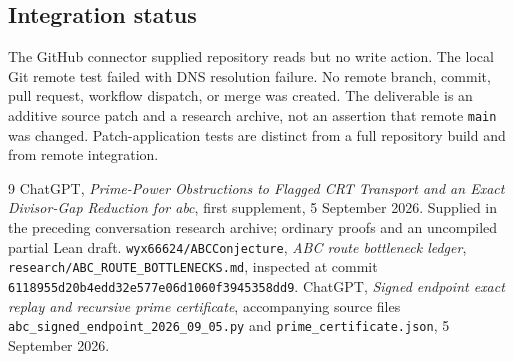 \documentclass[11pt]{article}
\theoremstyle{definition}\newtheorem{definition}[theorem]{Definition}
\theoremstyle{remark}\newtheorem{remark}[theorem]{Remark}
\begin{document}
\subsection{Integration status}
The GitHub connector supplied repository reads but no write action. The local Git remote test failed with DNS resolution failure. No remote branch, commit, pull request, workflow dispatch, or merge was created. The deliverable is an additive source patch and a research archive, not an assertion that remote \texttt{main} was changed. Patch-application tests are distinct from a full repository build and from remote integration.

\begin{thebibliography}{9}
 ChatGPT, \emph{Prime-Power Obstructions to Flagged CRT Transport and an Exact Divisor-Gap Reduction for abc}, first supplement, 5 September 2026. Supplied in the preceding conversation research archive; ordinary proofs and an uncompiled partial Lean draft.
 \texttt{wyx66624/ABCConjecture}, \emph{ABC route bottleneck ledger}, \texttt{research/ABC\_ROUTE\_BOTTLENECKS.md}, inspected at commit \texttt{6118955d20b4edd32e577e06d1060f3945358dd9}.
 ChatGPT, \emph{Signed endpoint exact replay and recursive prime certificate}, accompanying source files \texttt{abc\_signed\_endpoint\_2026\_09\_05.py} and \texttt{prime\_certificate.json}, 5 September 2026.
\end{thebibliography}
\end{document}
